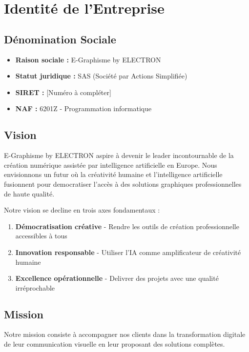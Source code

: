 \documentclass[12pt,a4paper,oneside]{book}
\begin{document}
\section{Identité de l'Entreprise}

\subsection{Dénomination Sociale}
\begin{itemize}
\item \textbf{Raison sociale :} E-Graphisme by ELECTRON
\item \textbf{Statut juridique :} SAS (Société par Actions Simplifiée)
\item \textbf{SIRET :} [Numéro à compléter]
\item \textbf{NAF :} 6201Z - Programmation informatique
\end{itemize}

\subsection{Vision}
E-Graphisme by ELECTRON aspire à devenir le leader incontournable de la création numérique assistée par intelligence artificielle en Europe. Nous envisionnons un futur où la créativité humaine et l'intelligence artificielle fusionnent pour democratiser l'accès à des solutions graphiques professionnelles de haute qualité.

Notre vision se decline en trois axes fondamentaux :
\begin{enumerate}
\item \textbf{Démocratisation créative} - Rendre les outils de création professionnelle accessibles à tous
\item \textbf{Innovation responsable} - Utiliser l'IA comme amplificateur de créativité humaine
\item \textbf{Excellence opérationnelle} - Delivrer des projets avec une qualité irréprochable
\end{enumerate}

\subsection{Mission}
Notre mission consiste à accompagner nos clients dans la transformation digitale de leur communication visuelle en leur proposant des solutions complètes.
\end{document}
